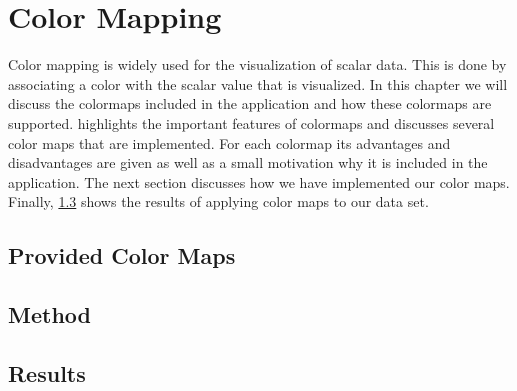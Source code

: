 
\chapter{Color Mapping} %
\label{cha:color_mapping}

Color mapping is widely used for the visualization of scalar data. This is done by associating a color with the scalar value that is visualized. In this chapter we will discuss the colormaps included in the application and how these colormaps are supported.  highlights the important features of colormaps and discusses several color maps that are implemented. For each colormap its advantages and disadvantages are given as well as a small motivation why it is included in the application. The next section discusses how we have implemented our color maps. Finally, \cref{s:colormapping:results} shows the results of applying color maps to our data set.  



% 

\section{Provided Color Maps}
\label{s:colormaps:differentmaps}


\section{Method}
\label{s:colormapping:method}





\section{Results}
\label{s:colormapping:results}



